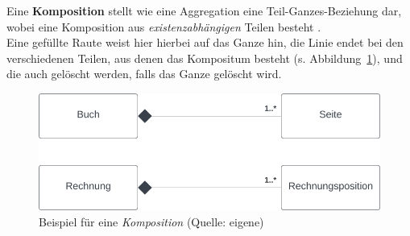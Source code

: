 Eine \textbf{Komposition} stellt wie eine Aggregation eine Teil-Ganzes-Beziehung dar, wobei eine Komposition aus \textit{existenzabhängigen} Teilen besteht .\\
Eine gefüllte Raute weist hier hierbei auf das Ganze hin, die Linie endet bei den verschiedenen Teilen, aus denen das Kompositum besteht (s. Abbildung~\ref{fig:composition}), und die auch gelöscht werden, falls das Ganze gelöscht wird.

\begin{figure}
    \begin{center}
        \includegraphics[scale=0.5]{chapters/OOP/img/komposition}
        \caption{Beispiel für eine \textit{Komposition} (Quelle: eigene)}
        \label{fig:composition}
    \end{center}
\end{figure}


